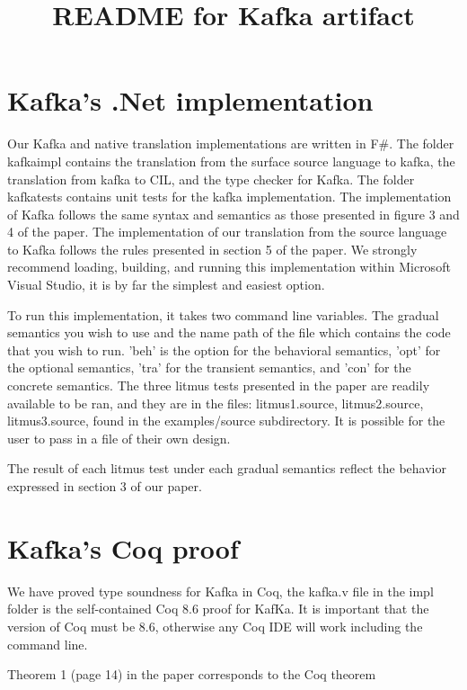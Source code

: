\documentclass[]{article}
\title{README for Kafka artifact}
\author{}
\date{}
\begin{document}
\maketitle

\section{Kafka's .Net implementation}

Our Kafka and native translation implementations are written in F$\#$. The folder kafkaimpl contains the translation from the surface source language to kafka, the translation from kafka to CIL, and the type checker for Kafka. The folder kafkatests contains unit tests for the kafka implementation. The implementation of Kafka follows the same syntax and semantics as those presented in figure 3 and 4 of the paper. The implementation of our translation from the source language to Kafka follows the rules presented in section 5 of the paper. We strongly recommend loading, building, and running this implementation within Microsoft Visual Studio, it is by far the simplest and easiest option. 

To run this implementation, it takes two command line variables. The gradual semantics you wish to use and the name path of the file which contains the code that you wish to run. 'beh' is the option for the behavioral semantics, 'opt' for the optional semantics, 'tra' for the transient semantics, and 'con' for the concrete semantics. The three litmus tests presented in the paper are readily available to be ran, and they are in the files: litmus1.source, litmus2.source, litmus3.source, found in the examples/source subdirectory. It is possible for the user to pass in a file of their own design.

The result of each litmus test under each gradual semantics reflect the behavior expressed in section 3 of our paper.


\section{Kafka's Coq proof}

We have proved type soundness for Kafka in Coq, the kafka.v file in the impl folder is the self-contained Coq 8.6 proof for KafKa. It is important that the version of Coq must be 8.6, otherwise any Coq IDE will work including the command line.

Theorem 1 (page 14) in the paper corresponds to the Coq theorem \\
\end{document}
